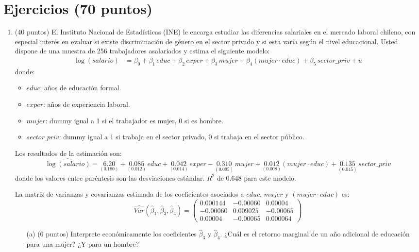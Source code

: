 \documentclass[10pt,a4paper]{article}
\begin{document}
\section{Ejercicios (70 puntos)}

\begin{enumerate}

     \color{black}  
    \item (40 puntos) El Instituto Nacional de Estadísticas (INE) le encarga estudiar las diferencias salariales en el mercado laboral chileno, con especial interés en evaluar si existe discriminación de género en el sector privado y si esta varía según el nivel educacional. Usted dispone de una muestra de 256 trabajadores asalariados y estima el siguiente modelo:
\begin{align*}
\log(salario) &= \beta_0 + \beta_1 \, educ + \beta_2 \, exper + \beta_3 \, mujer + \beta_4 (mujer \cdot educ) + \beta_5 \, sector\_priv + u
\end{align*}
donde:
\begin{itemize}
    \item $educ$: años de educación formal.
    \item $exper$: años de experiencia laboral.
    \item $mujer$: dummy igual a 1 si el trabajador es mujer, 0 si es hombre.
    \item $sector\_priv$: dummy igual a 1 si trabaja en el sector privado, 0 si trabaja en el sector público.
\end{itemize}

Los resultados de la estimación son:
\[
\widehat{\log(salario)} = \underset{(0.180)}{6.20} + \underset{(0.012)}{0.085} \, educ + \underset{(0.014)}{0.042} \, exper - \underset{(0.095)}{0.310} \, mujer + \underset{(0.008)}{0.012} (mujer \cdot educ) + \underset{(0.045)}{0.135} \, sector\_priv
\]
donde los valores entre paréntesis son las desviaciones estándar. $R^2$ de $0.648$ para este modelo.

La matriz de varianzas y covarianzas estimada de los coeficientes asociados a $educ$, $mujer$ y $(mujer \cdot educ)$ es:
\[
\widehat{Var}(\hat{\beta}_1, \hat{\beta}_3, \hat{\beta}_4) = 
\begin{pmatrix}
0.000144 & -0.00060 & 0.00004 \\
-0.00060 & 0.009025 & -0.00065 \\
0.00004 & -0.00065 & 0.000064
\end{pmatrix}
\]

\begin{enumerate}
    \item[(a)] (6 puntos) Interprete económicamente los coeficientes $\hat{\beta}_3$ y $\hat{\beta}_4$. ¿Cuál es el retorno marginal de un año adicional de educación para una mujer? ¿Y para un hombre?
    

\end{enumerate}
\end{enumerate}
\end{document}
